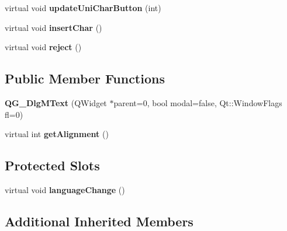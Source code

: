 \begin{DoxyCompactItemize}
\item 
\hypertarget{classQG__DlgMText_aa0ebd17930e3803e22f4b1229b940bc3}{virtual void {\bfseries update\-Uni\-Char\-Button} (int)}\label{classQG__DlgMText_aa0ebd17930e3803e22f4b1229b940bc3}

\item 
\hypertarget{classQG__DlgMText_ab76ec736bd75229336ffd8d1f5d6e9ec}{virtual void {\bfseries insert\-Char} ()}\label{classQG__DlgMText_ab76ec736bd75229336ffd8d1f5d6e9ec}

\item 
\hypertarget{classQG__DlgMText_ac4b415bc5b98df4701bd89c502697df8}{virtual void {\bfseries reject} ()}\label{classQG__DlgMText_ac4b415bc5b98df4701bd89c502697df8}

\end{DoxyCompactItemize}
\subsection*{Public Member Functions}
\begin{DoxyCompactItemize}
\item 
\hypertarget{classQG__DlgMText_a13b79af5cb3448b6befb590ca64a622b}{{\bfseries Q\-G\-\_\-\-Dlg\-M\-Text} (Q\-Widget $\ast$parent=0, bool modal=false, Qt\-::\-Window\-Flags fl=0)}\label{classQG__DlgMText_a13b79af5cb3448b6befb590ca64a622b}

\item 
\hypertarget{classQG__DlgMText_a0cd1b1842a2c35c62f3c51de759c9047}{virtual int {\bfseries get\-Alignment} ()}\label{classQG__DlgMText_a0cd1b1842a2c35c62f3c51de759c9047}

\end{DoxyCompactItemize}
\subsection*{Protected Slots}
\begin{DoxyCompactItemize}
\item 
\hypertarget{classQG__DlgMText_a96baa359f7890c1e0fcb3b610b5c9475}{virtual void {\bfseries language\-Change} ()}\label{classQG__DlgMText_a96baa359f7890c1e0fcb3b610b5c9475}

\end{DoxyCompactItemize}
\subsection*{Additional Inherited Members}


